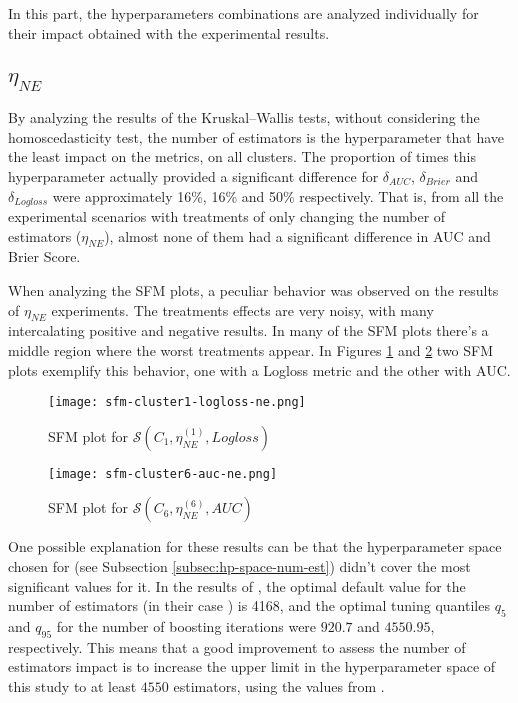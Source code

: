 In this part, the hyperparameters combinations are analyzed individually for their impact obtained with the experimental results.

\subsection{\texorpdfstring{\Large$\eta_{NE}$}{}}
\label{subsec:res-ne}

By analyzing the results of the Kruskal–Wallis tests, without considering the homoscedasticity test, the number of estimators is the hyperparameter that have the least impact on the metrics, on all clusters. The proportion of times this hyperparameter actually provided a significant difference for $\delta_{AUC}$, $\delta_{Brier}$ and $\delta_{Logloss}$ were approximately 16\%, 16\% and 50\% respectively. That is, from all the experimental scenarios with treatments of only changing the number of estimators ($\eta_{NE}$), almost none of them had a significant difference in AUC and Brier Score.

When analyzing the SFM plots, a peculiar behavior was observed on the results of $\eta_{NE}$ experiments. The treatments effects are very noisy, with many intercalating positive and negative results. In many of the SFM plots there's a middle region where the worst treatments appear. In Figures \ref{fig:sfm-ne-1} and \ref{fig:sfm-ne-2} two SFM plots exemplify this behavior, one with a Logloss metric and the other with AUC. 

\begin{figure}[H]
    \centering
    \texttt{[image: sfm-cluster1-logloss-ne.png]}
    \caption{SFM plot for $\mathcal{S}(C_1, \eta^{(1)}_{NE}, Logloss)$}
    \label{fig:sfm-ne-1}
\end{figure}

\begin{figure}[H]
    \centering
    \texttt{[image: sfm-cluster6-auc-ne.png]}
    \caption{SFM plot for $\mathcal{S}(C_6, \eta^{(6)}_{NE}, AUC)$}
    \label{fig:sfm-ne-2}
\end{figure}

One possible explanation for these results can be that the hyperparameter space chosen for   (see Subsection \ref{subsec:hp-space-num-est}) didn't cover the most significant values for it. In the results of \cite{probst2018tunability}, the optimal default value for the number of estimators (in their case ) is 4168, and the optimal tuning quantiles $q_5$ and $q_{95}$ for the number of boosting iterations were $920.7$ and $4550.95$, respectively. This means that a good improvement to assess the number of estimators impact is to increase the upper limit in the hyperparameter space of this study to at least $4550$ estimators, using the values from \cite{probst2018tunability}.

